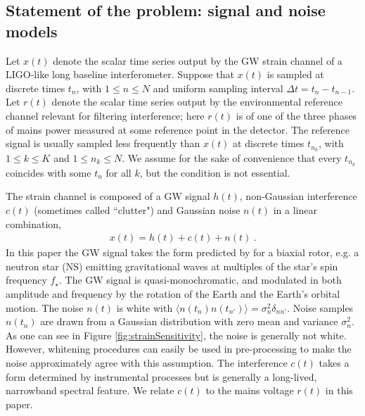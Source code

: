 \documentclass[pra,superscriptaddress,reprint,amsmath,amssymb,nofootinbib]{revtex4-2}
\begin{document}
\subsection{Statement of the problem: signal and noise models}  \label{sec21}
Let $x(t)$ denote the scalar time series output by the GW strain channel of a LIGO-like long baseline interferometer. Suppose that $x(t)$ is sampled at discrete times $t_n$, with $1 \leq n \leq N$ and uniform sampling interval $\Delta t = t_n - t_{n-1}$. Let $r(t)$ denote the scalar time series output by the environmental reference channel relevant for filtering interference; here $r(t)$ is of one of the three phases of mains power measured at some reference point in the detector. The reference signal is usually sampled less frequently than $x(t)$ at discrete times $t_{n_k}$, with $1 \leq k \leq K$ and $1 \leq n_k \leq N$. We assume for the sake of convenience that every $t_{n_k}$ coincides with some $t_n$ for all $k$, but the condition is not essential. \newline 

The strain channel is composed of a GW signal $h(t)$, non-Gaussian interference $c(t)$ (sometimes called ``clutter") and Gaussian noise $n(t)$ in a linear combination,
\begin{eqnarray}
	x(t) = h(t) + c(t) + n(t) \ .
	\label{eq:data}
\end{eqnarray}
 In this paper the GW signal takes the form predicted by \citet{Jaranowski1998} for a biaxial rotor, e.g. a neutron star (NS) emitting gravitational waves at multiples of the star's spin frequency $f_{\star}$. The GW signal is quasi-monochromatic, and modulated in both amplitude and frequency by the rotation of the Earth and the Earth's orbital motion. The noise $n(t)$ is white with $\langle n(t_n) n(t_{n'})\rangle = \sigma_n^2 \delta_{n n'}$. Noise samples $n(t_n)$ are drawn from a Gaussian distribution with zero mean and variance $\sigma_n^2$. As one can see in Figure \ref{fig:strainSensitivity}, the noise is generally not white. However, whitening procedures can easily be used in pre-processing to make the noise approximately agree with this assumption. The interference $c(t)$ takes a form determined by instrumental processes but is generally a long-lived, narrowband spectral feature. We relate $c(t)$ to the mains voltage $r(t)$ in this paper. \newline 
 
 
 
\end{document}
